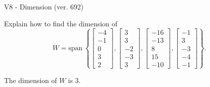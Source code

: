 \begin{exercise}
  \begin{exerciseTitle}V8 - Dimension (ver. 692)\end{exerciseTitle}
  \begin{exerciseStatement}
    Explain how to find the dimension of 
\[W=\mathrm{span}\ \left\{\left[\begin{array}{r}
-4 \\
-1 \\
0 \\
3 \\
2
\end{array}\right] , \left[\begin{array}{r}
3 \\
3 \\
-2 \\
-3 \\
3
\end{array}\right] , \left[\begin{array}{r}
-16 \\
-13 \\
8 \\
15 \\
-10
\end{array}\right] , \left[\begin{array}{r}
-1 \\
3 \\
-3 \\
-4 \\
-1
\end{array}\right]\right\}.\]



  \end{exerciseStatement}
  \begin{exerciseAnswer}
   The dimension of \(W\) is  \(3\).
  


  \end{exerciseAnswer}
\end{exercise}